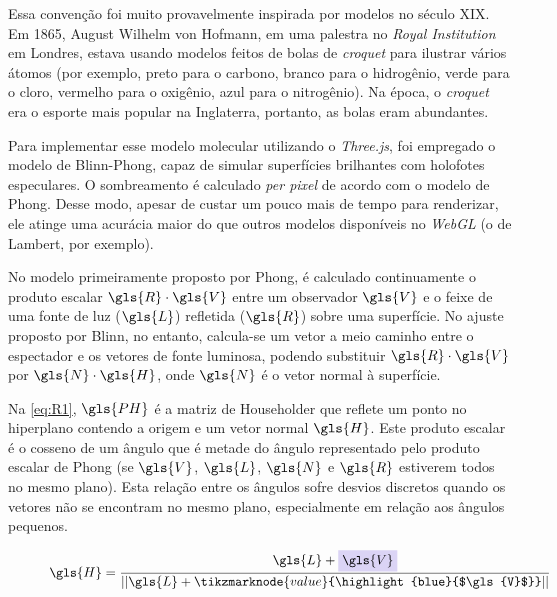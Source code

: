 Essa convenção foi muito provavelmente inspirada por modelos no século XIX. Em 1865, August Wilhelm von Hofmann, em uma palestra no \textit{Royal Institution} em Londres, estava usando modelos feitos de bolas de \textit{croquet} para ilustrar vários átomos (por exemplo, preto para o carbono, branco para o hidrogênio, verde para o cloro, vermelho para o oxigênio, azul para o nitrogênio)\autocite{Crossland2004-ll}. Na época, o \textit{croquet} era o esporte mais popular na Inglaterra, portanto, as bolas eram abundantes.

Para implementar esse modelo molecular utilizando o \textit{Three.js}, foi empregado o modelo de Blinn-Phong, capaz de simular superfícies brilhantes com holofotes especulares. O sombreamento é calculado \textit{per pixel} de acordo com o modelo de Phong. Desse modo, apesar de custar um pouco mais de tempo para renderizar, ele atinge uma acurácia maior do que outros modelos disponíveis no \textit{WebGL} (o de Lambert, por exemplo).

No modelo primeiramente proposto por Phong, é calculado continuamente o produto escalar $\gls{R} \cdot \gls{V}$ entre um observador $\gls{V}$ e o feixe de uma fonte de luz ($\gls{L}$) refletida ($\gls{R}$) sobre uma superfície. No ajuste proposto por Blinn, no entanto, calcula-se um vetor a meio caminho entre o espectador e os vetores de fonte luminosa, podendo substituir $\gls{R} \cdot \gls{V}$ por $\gls{N} \cdot \gls{H}$, onde $\gls{N}$ é o vetor normal à superfície.

Na \autoref{eq:R1}, $\gls{PH}$ é a matriz de Householder que reflete um ponto no hiperplano contendo a origem e um vetor normal $\gls{H}$. Este produto escalar é o cosseno de um ângulo que é metade do ângulo representado pelo produto escalar de Phong (se $\gls{V}$, $\gls{L}$, $\gls{N}$ e $\gls{R}$ estiverem todos no mesmo plano). Esta relação entre os ângulos sofre desvios discretos quando os vetores não se encontram no mesmo plano, especialmente em relação aos ângulos pequenos.

\begin{figure}[htb]
\begin{equation}
    \label{eq:R1}
    \gls{H} = \frac{\gls{L} + \highlight{blue}{$\gls{V}$} }{||\gls{L} + \tikzmarknode{value}{\highlight{blue}{$\gls{V}$}}||}
\end{equation}
\vspace{2\baselineskip}
\end{figure}

